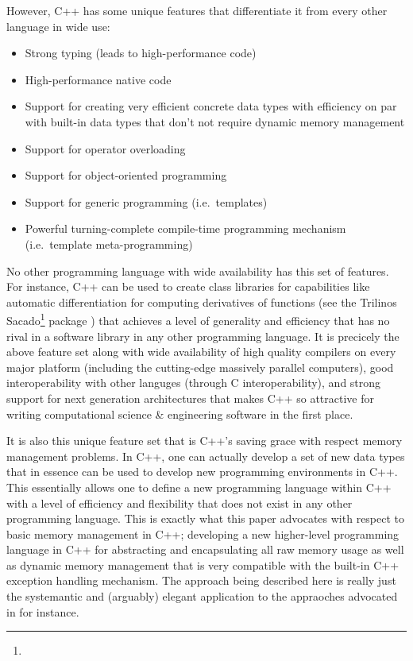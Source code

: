 \documentclass[pdf,ps2pdf,11pt]{SANDreport}
\begin{document}
However, C++ has some unique features that differentiate it from every
other language in wide use:

\begin{itemize}

{}\item Strong typing (leads to high-performance code)

{}\item High-performance native code

{}\item Support for creating very efficient concrete data types with
efficiency on par with built-in data types that don't not require
dynamic memory management

{}\item Support for operator overloading

{}\item Support for object-oriented programming

{}\item Support for generic programming (i.e.\ templates)

{}\item Powerful turning-complete compile-time programming mechanism
(i.e.\ template meta-programming)

\end{itemize}

No other programming language with wide availability has this set of
features.  For instance, C++ can be used to create class libraries for
capabilities like automatic differentiation {}\cite{ref:ad} for
computing derivatives of functions (see the Trilinos
Sacado\footnote{}
package {}\cite{phippsEtAl2006}) that achieves a level of generality
and efficiency that has no rival in a software library in any other
programming language.  It is precicely the above feature set along
with wide availability of high quality compilers on every major
platform (including the cutting-edge massively parallel computers),
good interoperability with other languges (through C
interoperability), and strong support for next generation
architectures {}\cite{DesignIssuesForMultiCore08} that makes C++ so
attractive for writing computational science \& engineering software
in the first place.

It is also this unique feature set that is C++'s saving grace with
respect memory management problems.  In C++, one can actually develop
a set of new data types that in essence can be used to develop new
programming environments in C++.  This essentially allows one to
define a new programming language within C++ with a level of
efficiency and flexibility that does not exist in any other
programming language.  This is exactly what this paper advocates with
respect to basic memory management in C++; developing a new
higher-level programming language in C++ for abstracting and
encapsulating all raw memory usage as well as dynamic memory
management that is very compatible with the built-in C++ exception
handling mechanism.  The approach being described here is really just
the systemantic and (arguably) elegant application to the appraoches
advocated in {}\cite[Section 13.2: Pointers]{CodeComplete2nd04} for
instance.
\end{document}
